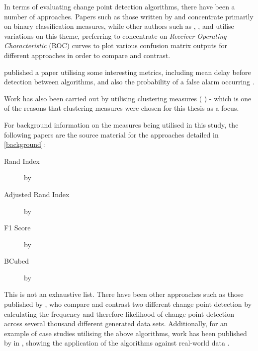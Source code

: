 \documentclass[../main.tex]{subfiles}
\begin{document}
In terms of evaluating change point detection algorithms, there have been a number of approaches. Papers such as those written by \citeauthor{Buntain2014} \cite{Buntain2014} and \citeauthor{Qahtan2015} \cite{Qahtan2015} concentrate primarily on binary classification measures, while other authors such as \citeauthor{Desobry2005} \cite{Desobry2005}, \citeauthor{Fawcett1999} \cite{Fawcett1999}, and \citeauthor{Kawahara2009} \cite{Kawahara2009} utilise variations on this theme, preferring to concentrate on \emph{Receiver Operating Characteristic} (ROC) curves to plot various confusion matrix outputs for different approaches in order to compare and contrast.

\citeauthor{Downey2008} published a paper utilising some interesting metrics, including mean delay before detection between algorithms, and also the probability of a false alarm occurring \cite{Downey2008}.

Work has also been carried out by \citeauthor{Matteson2012} utilising clustering measures ( \cite{Matteson2012}) - which is one of the reasons that clustering measures were chosen for this thesis as a focus.

For background information on the measures being utilised in this study, the following papers are the source material for the approaches detailed in \autoref{background}:

\begin{description}
    \item[Rand Index]  by \citeauthor{Rand1971} \cite{Rand1971}
    \item[Adjusted Rand Index]  by \citeauthor{Hubert1985} \cite{Hubert1985}
    \item[F1 Score]  by \citeauthor{Kent1955} \cite{Kent1955}
    \item[BCubed]  by \citeauthor{Bagga1998} \cite{Bagga1998} 
\end{description}

This is not an exhaustive list. There have been other approaches such as those published by \citeauthor{Madrid2004} \cite{Madrid2004}, who compare and contrast two different change point detection by calculating the frequency and therefore likelihood of change point detection across several thousand different generated data sets. Additionally, for an example of case studies utilising the above algorithms, work has been published by \citeauthor{Killick2014} in , showing the application of the algorithms against real-world data \cite{Killick2014}.
    
\end{document}
